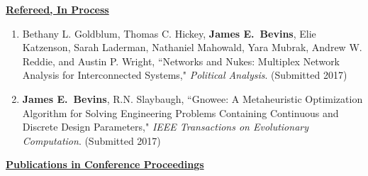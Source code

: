 
\underline{\textbf{Refereed, In Process}}

\begin{enumerate}
  
  \item Bethany L. Goldblum, Thomas C. Hickey, \textbf{James E.\ Bevins}, Elie Katzenson, Sarah Laderman, Nathaniel Mahowald, Yara Mubrak, Andrew W. Reddie, and Austin P. Wright, ``Networks and Nukes: Multiplex Network Analysis for Interconnected Systems," \textit{Political Analysis}. (Submitted 2017)

  \item \textbf{James E.\ Bevins}, R.N. Slaybaugh, ``Gnowee: A Metaheuristic Optimization Algorithm for Solving Engineering Problems Containing Continuous and Discrete Design Parameters," \textit{IEEE Transactions on Evolutionary Computation}. (Submitted 2017)
  
\end{enumerate}


\underline{\textbf{Publications in Conference Proceedings}}

